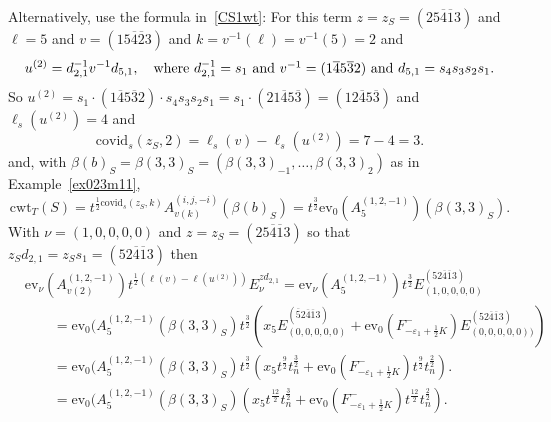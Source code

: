 \documentclass[11pt]{article}
\theoremstyle{plain}
\theoremstyle{definition}
\newenvironment{example}
  {\pushQED{\qed}\exampleinner}
  {\popQED\endexampleinner}
\theoremstyle{remark}
\numberwithin{equation}{section}
\def\ev{\mathrm{ev}}
\newcounter{r}
\newcounter{s}
\begin{document}
\begin{example}
Alternatively, use the formula in~\eqref{CS1wt}:
For this term $z=z_S=(25\overline{4}\overline{1}3)$ and $\ell = 5$ and 
$v = (15\overline{4}\overline{2}3)$ and $k=v^{-1}(\ell) = v^{-1}(5) = 2$ and
$$u^{(2)} = d^{-1}_{2,1}v^{-1}d_{5,1},
\quad\hbox{where
$d^{-1}_{2,1}=s_1$ and $v^{-1}=(1\overline{4}5\overline{3}2)$ and $d_{5,1} = s_4s_3s_2s_1$.}
$$
So $u^{(2)}=s_1\cdot (1\overline{4}5\overline{3}2)\cdot s_4s_3s_2s_1 = 
s_1\cdot (21\overline{4}5\overline{3})= (12\overline{4}5\overline{3})$ and $\ell_s(u^{(2)})=4$ and 
$$\mathrm{covid}_s(z_S,2) = \ell_s(v)-\ell_s(u^{(2)})
=7-4=3.
$$
and, with $\beta(b)_S = \beta(3,3)_S = (\beta(3,3)_{-1}, \ldots, \beta(3,3)_2)$ as in 
Example~\ref{ex023m11},
$$\mathrm{cwt}_T(S) = t^{\frac12\mathrm{covid}_s(z_S,k)}A_{v(k)}^{(i,j,-i)}(\beta(b)_S)
=t^{\frac32}\ev_0(A^{(1,2,-1)}_5)(\beta(3,3)_S).$$
With $\nu=(1,0,0,0,0)$ and $z=z_S=(25\overline{4}\overline{1}3)$ so that $z_Sd_{2,1} = z_Ss_1 = (52\overline{4}\overline{1}3)$ then
\begin{align*}
&\ev_\nu(A^{(1,2,-1)}_{v(2)})t^{\frac12(\ell(v)-\ell(u^{(2)}))}E^{zd_{2,1}}_\nu 
= 
\ev_\nu(A^{(1,2,-1)}_5)t^{\frac32} E^{(52\overline{4}\overline{1}3)}_{(1,0,0,0,0)}
\\
&\qquad
= \ev_0(A^{(1,2,-1)}_5(\beta(3,3)_S) t^{\frac32} (x_5E^{(\overline{5}2\overline{4}\overline{1}3)}_{(0,0,0,0,0)}
+\ev_0(F^-_{-\varepsilon_1+\frac12 K})E^{(52\overline{4}\overline{1}3)}_{(0,0,0,0,0))})
\\
&\qquad
= \ev_0(A^{(1,2,-1)}_5(\beta(3,3)_S) t^{\frac32} (x_5t^{\frac92}t_n^{\frac32}
+\ev_0(F^-_{-\varepsilon_1+\frac12 K})t^{\frac92}t_n^{\frac22}).
\\
&\qquad
= \ev_0(A^{(1,2,-1)}_5(\beta(3,3)_S)  (x_5t^{\frac{12}{2}}t_n^{\frac32}
+\ev_0(F^-_{-\varepsilon_1+\frac12 K})t^{\frac{12}{2}}t_n^{\frac22}).
\end{align*}
\end{example}
\end{document}
